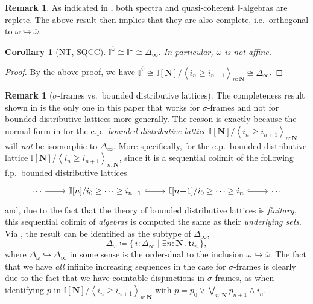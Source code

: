 \documentclass[a4paper,12pt]{amsart}
\newtheorem{corollary}[theorem]{Corollary}
\theoremstyle{definition}
\newtheorem{remark}[theorem]{Remark}
\newcommand{\mb}[1]{\mathbf{#1}}
\newcommand{\mbb}[1]{\mathbb{#1}}
\newcommand{\I}{\mbb I}
\newcommand{\ms}[1]{\mathsf{#1}}
\newcommand{\ov}[1]{\overline{#1}}
\newcommand{\pair}[1]{\left\langle#1\right\rangle}
\newcommand{\scomp}[2]{\{\,#1\mid#2\,\}}
\newcommand{\hook}{\hookrightarrow}
\newcommand{\N}{\mb N}
\newcommand{\ex}[2]{\exists #1\!\colon\!\!#2\mathpunct{.}}
\begin{document}
\begin{remark}
  As indicated in , both spectra and quasi-coherent $\I$-algebras are replete. The above result then implies that they are also complete, i.e.\ orthogonal to $\omega\hook\ov\omega$.
\end{remark}

\begin{corollary}[NT, SQCC]
  $\I^{\ov\omega} \cong \I^\omega \cong \Delta_\infty$. In particular, $\omega$ is not affine.
\end{corollary}
\begin{proof}
  By the above proof, we have $\I^{\ov\omega} \cong \I[\N]/\pair{i_n \ge i_{n+1}}_{n:\N} \cong \Delta_\infty$.
\end{proof}

\begin{remark}[$\sigma$-frames vs.\ bounded distributive lattices]\label{rem:whynotdis}
  The completeness result shown in  is the only one in this paper that works for $\sigma$-frames and not for bounded distributive lattices more generally. The reason is exactly because the normal form in  for the c.p.\ \emph{bounded distributive lattice} $\I[\N]/\pair{i_n \ge i_{n+1}}_{n:\N}$ will \emph{not} be isomorphic to $\Delta_\infty$. More specifically, for the c.p.\ bounded distributive lattice $\I[\N]/\pair{i_n \ge i_{n+1}}_{n:\N}$, since it is a sequential colimit of the following f.p.\ bounded distributive lattices
  \[ 
  \begin{tikzcd}
    \cdots \ar[r] & \I[n]/i_{0} \ge \cdots \ge i_{n-1} \ar[r, hook] & \I[n\!+\!1]/i_0 \ge \cdots \ge i_n \ar[r, hook] & \cdots
  \end{tikzcd}
  \]
  and, due to the fact that the theory of bounded distributive lattices is \emph{finitary}, this sequential colimit of \emph{algebras} is computed the same as their \emph{underlying sets}. Via , the result can be identified as the subtype of $\Delta_\infty$,
  \[ \Delta_\omega \coloneq \scomp{i : \Delta_\infty}{\ex n\N \ms ti_n}, \]
  where $\Delta_\omega \hook \Delta_\infty$ in some sense is the order-dual to the inclusion $\omega\hook\ov\omega$. The fact that we have \emph{all} infinite increasing sequences in the case for $\sigma$-frames is clearly due to the fact that we have countable disjunctions in $\sigma$-frames, as when identifying $p$ in $\I[\N]/\pair{i_n \ge i_{n+1}}_{n:\N}$ with $p = p_0 \vee \bigvee_{n:\N}p_{n+1}\wedge i_n$.
\end{remark}
\end{document}
